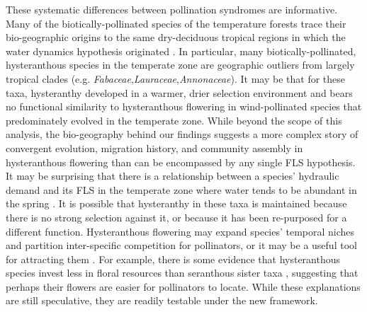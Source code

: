 \documentclass{article}
\begin{document}
\noindent These systematic differences between pollination syndromes are informative. Many of the biotically-pollinated species of the temperature forests trace their bio-geographic origins to the same dry-deciduous tropical regions \citep{Daubenmire1972} in which the water dynamics hypothesis originated \citep{Janzen1967,Franklin2016}. In particular, many biotically-pollinated, hysteranthous species in the temperate zone are geographic outliers from largely tropical clades (e.g. \textit{Fabaceae},\textit{Lauraceae},\textit{Annonaceae}). It may be that for these taxa, hysteranthy developed in a warmer, drier selection environment and bears no functional similarity to hysteranthous flowering in wind-pollinated species that predominately evolved in the temperate zone. While beyond the scope of this analysis, the bio-geography behind our findings suggests a more complex story of convergent evolution, migration history, and community assembly in hysteranthous flowering than can be encompassed by any single FLS hypothesis.\\

\noindent It may be surprising that there is a relationship between a species' hydraulic demand and its FLS in the temperate zone where water tends to be abundant in the spring \citep{Polgar2011}. It is possible that hysteranthy in these taxa is maintained because there is no strong selection against it, or because it has been re-purposed for a different function. Hysteranthous flowering may expand species' temporal niches and partition inter-specific competition for pollinators, or it may be a useful tool for attracting them \citep{Janzen1967}. For example, there is some evidence that hysteranthous species invest less in floral resources than seranthous sister taxa \citep{Gunatilleke1984}, suggesting that perhaps their flowers are easier for pollinators to locate. While these explanations are still speculative, they are readily testable under the new framework.\\

\end{document}
